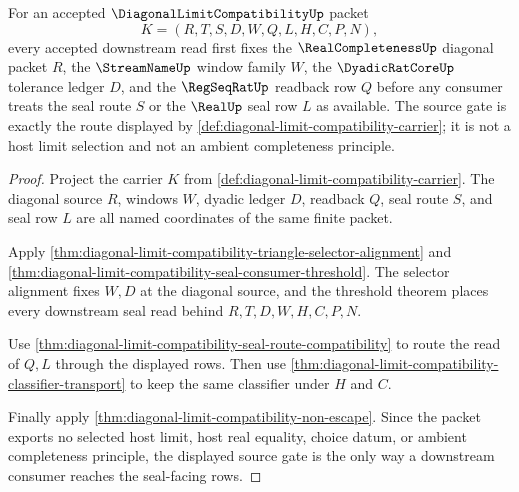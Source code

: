 \begin{theorem}
\label{thm:diagonallimitcompatibility-source-gate}
For an accepted $\DiagonalLimitCompatibilityUp$ packet
$$
K=(R,T,S,D,W,Q,L,H,C,P,N),
$$
every accepted downstream read first fixes the $\RealCompletenessUp$ diagonal packet $R$, the $\StreamNameUp$ window family $W$, the $\DyadicRatCoreUp$ tolerance ledger $D$, and the $\RegSeqRatUp$ readback row $Q$ before any consumer treats the seal route $S$ or the $\RealUp$ seal row $L$ as available. The source gate is exactly the route displayed by \autoref{def:diagonal-limit-compatibility-carrier}; it is not a host limit selection and not an ambient completeness principle.
\end{theorem}
\begin{proof}
Project the carrier $K$ from \autoref{def:diagonal-limit-compatibility-carrier}. The diagonal source $R$, windows $W$, dyadic ledger $D$, readback $Q$, seal route $S$, and seal row $L$ are all named coordinates of the same finite packet.

Apply \autoref{thm:diagonal-limit-compatibility-triangle-selector-alignment} and \autoref{thm:diagonal-limit-compatibility-seal-consumer-threshold}. The selector alignment fixes $W,D$ at the diagonal source, and the threshold theorem places every downstream seal read behind $R,T,D,W,H,C,P,N$.

Use \autoref{thm:diagonal-limit-compatibility-seal-route-compatibility} to route the read of $Q,L$ through the displayed rows. Then use \autoref{thm:diagonal-limit-compatibility-classifier-transport} to keep the same classifier under $H$ and $C$.

Finally apply \autoref{thm:diagonal-limit-compatibility-non-escape}. Since the packet exports no selected host limit, host real equality, choice datum, or ambient completeness principle, the displayed source gate is the only way a downstream consumer reaches the seal-facing rows.
\end{proof}

